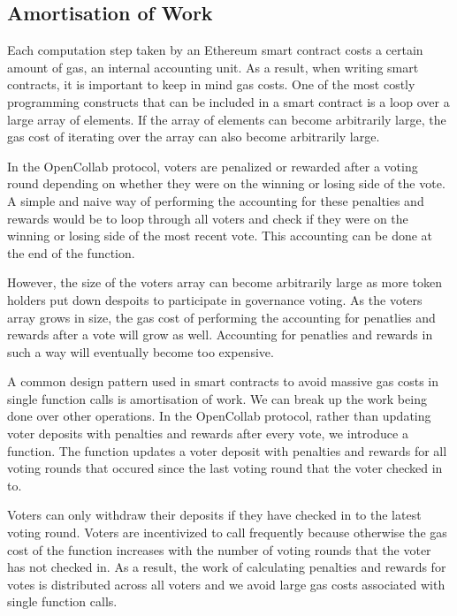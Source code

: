 \subsection{Amortisation of Work}

Each computation step taken by an Ethereum smart contract costs a certain amount
of gas, an internal accounting unit. As a result, when writing smart contracts,
it is important to keep in mind gas costs. One of the most costly programming
constructs that can be included in a smart contract is a loop over a large array
of elements. If the array of elements can become arbitrarily large, the gas cost
of iterating over the array can also become arbitrarily large.

In the OpenCollab protocol, voters are penalized or rewarded after a voting
round depending on whether they were on the winning or losing side of the vote.
A simple and naive way of performing the accounting for these penalties and
rewards would be to loop through all voters and check if they were on the
winning or losing side of the most recent vote. This accounting can be done at
the end of the  function.

However, the size of the voters array can become arbitrarily large as more token
holders put down despoits to participate in governance voting. As the voters
array grows in size, the gas cost of performing the accounting for penatlies and
rewards after a vote will grow as well. Accounting for penatlies and rewards in
such a way will eventually become too expensive.

A common design pattern used in smart contracts to avoid massive gas costs in
single function calls is amortisation of work\cite{amortisationWork}. We can
break up the work being done over other operations. In the OpenCollab protocol,
rather than updating voter deposits with penalties and rewards after every vote,
we introduce a  function. The function updates a voter
deposit with penalties and rewards for all voting rounds that occured since the
last voting round that the voter checked in to.

Voters can only withdraw their deposits if they have checked in to the latest voting round. Voters are
incentivized to call  frequently because otherwise the
gas cost of the function increases with the number of voting rounds that the
voter has not checked in. As a result, the work of calculating penalties and rewards for votes is distributed across
all voters and we avoid large gas costs associated with single function calls.

